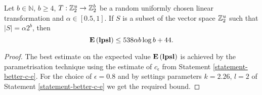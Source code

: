 \begin{corollary}
\label{corollary-best-elpsl}
Let $b \in \mathbb{N}$, $b \geq 4$, $T: \mathbb{Z}_{2}^{u} \rightarrow \mathbb{Z}_{2}^{b}$ be a random uniformly chosen linear transformation and $\alpha \in \left[0.5, 1\right]$. If $S$ is a subset of the vector space $\mathbb{Z}_{2}^{u}$ such that $|S| = \alpha 2 ^ b$, then \[ \mathbf{E}\left(\mathbf{lpsl}\right) \leq 538 \alpha b \log b + 44 \text{.} \] 
\end{corollary}
\begin{proof}
The best estimate on the expected value $\mathbf{E}\left(\mathbf{lpsl}\right)$ is achieved by the parametrisation technique using the estimate of $c_\epsilon$ from Statement \ref{statement-better-c-e}. For the choice of $\epsilon = 0.8$ and by settings parameters $k = 2.26$, $l = 2$ of Statement \ref{statement-better-c-e} we get the required bound.
\end{proof}
